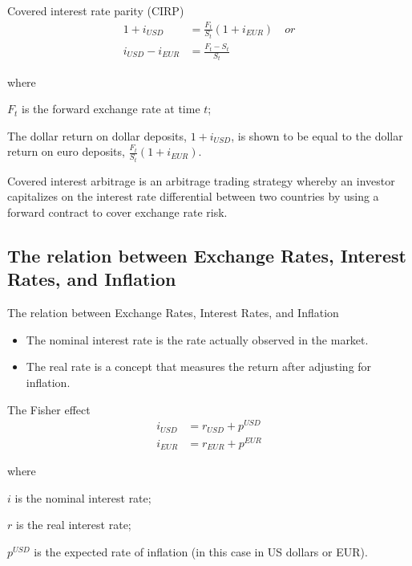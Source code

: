 \documentclass[international_finance_p2.tex]{subfiles}
\begin{document}
\begin{frame}{Covered interest rate parity (CIRP)}
\begin{align}
1+i_{USD}&=\frac{F_t}{S_t}(1+i_{EUR}) \quad \nonumber or\\
i_{USD}-i_{EUR}&=\frac{F_t-S_t}{S_t}
\end{align}

where

$F_t$ is the forward exchange rate at time $t$;

The dollar return on dollar deposits, $1+i_{USD}$, is shown to be equal to the dollar return on euro deposits, $\frac{F_t}{S_t}(1+i_{EUR})$.

Covered interest arbitrage is an arbitrage trading strategy whereby an investor capitalizes on the interest rate differential between two countries by using a forward contract to cover exchange rate risk.

\end{frame}
\subsection{The relation between Exchange Rates, Interest Rates, and Inflation}
\begin{frame}{The relation between Exchange Rates, Interest Rates, and Inflation}
\begin{itemize}[<+->]
\item
The nominal interest rate is the rate actually observed in the market. 
\item
The real rate is a concept that measures the return after adjusting for inflation.
\end{itemize}
\end{frame}
\begin{frame}{The Fisher effect}
\begin{align}
i_{USD}&=r_{USD}+p^{USD}\\
i_{EUR}&=r_{EUR}+p^{EUR}
\end{align}

where 

$i$ is the nominal interest rate;

$r$ is the real interest rate;

$p^{USD}$ is the expected rate of inflation (in this case in US dollars or EUR).
\end{frame}
\end{document}
